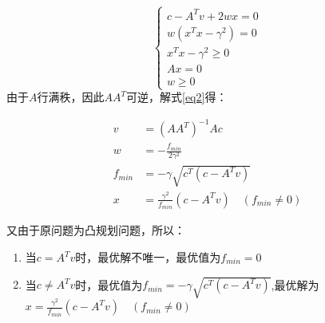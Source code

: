 \documentclass[a4paper]{article}
\begin{document}
\begin{equation}
\label{eq2}
\left\{
\begin{array}{c}
c-A^Tv+2wx=0 \\
w(x^Tx-\gamma^2)=0 \\
x^Tx-\gamma^2\ge 0 \\
Ax=0 \\
w\ge 0
\end{array}
\right.
\end{equation}
由于$A$行满秩，因此$AA^T$可逆，解式\ref{eq2}得：

\begin{equation}
\begin{aligned}
v&=(AA^T)^{-1}Ac \\
w&=-\frac{f_{min}}{2\gamma^2} \\
f_{min}&=-\gamma\sqrt{c^T(c-A^Tv)} \\
x&=\frac{\gamma^2}{f_{min}}(c-A^Tv)\quad(f_{min}\ne 0)
\end{aligned}
\end{equation}

又由于原问题为凸规划问题，所以：
\begin{enumerate}
	\item 当$c=A^Tv$时，最优解不唯一，最优值为$f_{min}=0$
	\item 当$c\neq A^Tv$时，最优值为$f_{min}=-\gamma\sqrt{c^T(c-A^Tv)}$,最优解为$x=\frac{\gamma^2}{f_{min}}(c-A^Tv)\quad(f_{min}\ne 0)$
\end{enumerate}
\end{document}
